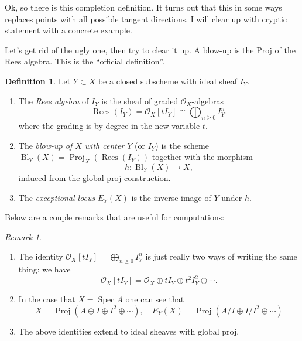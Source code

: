 \documentclass[12pt]{article}
\numberwithin{equation}{section}
\theoremstyle{definition}
\newtheorem{definition}[theorem]{Definition}
\theoremstyle{remark}
\newtheorem{remark}[theorem]{Remark}
\newcommand{\Ocal}{\mathcal{O}}
\newcommand{\Spec}{\operatorname{Spec}}
\newcommand{\Proj}{\operatorname{Proj}}
\newcommand{\Bl}{\operatorname{Bl}}
\newcommand{\Rees}{\operatorname{Rees}}
\begin{document}
Ok, so there is this completion definition. 
It turns out that this in some ways replaces points with all possible tangent directions. 
I will clear up with cryptic statement with a concrete example.

Let's get rid of the ugly one, then try to clear it up. 
A blow-up is the Proj of the Rees algebra. 
This is the ``official definition''.
\begin{definition}
	Let $Y \subset X$ be a closed subscheme with ideal sheaf $I_Y$. 
	\begin{enumerate}
	\item The \emph{Rees algebra} of $I_Y$ is the sheaf of graded $\Ocal_X$-algebras 
	 $$ \Rees(I_Y) = \Ocal_X[t I_Y] \cong \bigoplus_{n\geq 0} I_Y^{n}.$$
	 where the grading is by degree in the new variable $t$.
	\item The \emph{blow-up of $X$ with center $Y$} (or $I_Y$) is the scheme $\Bl_Y(X) = \Proj_X(\Rees(I_Y))$ together with the morphism 
	 $$ h: \Bl_Y(X) \to X,$$
	induced from the global proj construction.
	\item The \emph{exceptional locus} $E_Y(X)$ is the inverse image of $Y$ under $h$. 
	\end{enumerate}
\end{definition}

Below are a couple remarks that are useful for computations:
\begin{remark}
\begin{enumerate}
\item The identity $\Ocal_X[tI_Y]=\bigoplus_{n\geq 0} I_Y^{n}$ is just really two ways of writing the same thing: we have 
$$\Ocal_X[tI_Y] = \Ocal_X \oplus tI_Y \oplus t^2 I_Y^2\oplus \cdots.$$
\item In the case that $X=\Spec A$ one can see that 
 $$ X = \Proj( A\oplus I \oplus I^2 \oplus \cdots ), \quad  E_Y(X) = \Proj( A/I \oplus I/I^2 \oplus \cdots ) $$
\item The above identities extend to ideal sheaves with global proj.
 \end{enumerate}
\end{remark}
\end{document}
